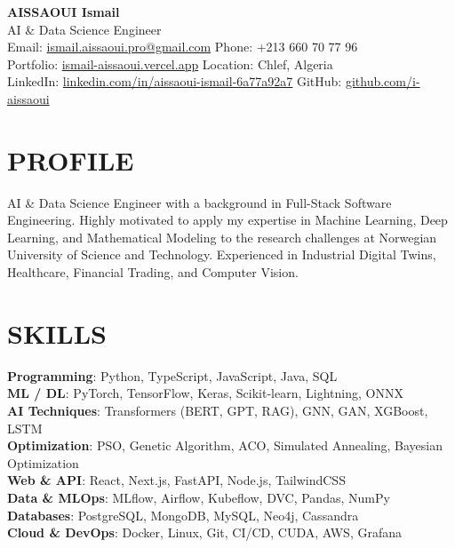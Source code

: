 \documentclass[a4paper,12pt]{article}
\begin{document}
\begin{center}
    {\Huge\bfseries\color{titleblue} AISSAOUI Ismail}\\[4pt]
    {\Large AI \& Data Science Engineer}\\[6pt]

    {\normalsize
    Email: \href{mailto:ismail.aissaoui.pro@gmail.com}{ismail.aissaoui.pro@gmail.com} \quad
    Phone: +213 660 70 77 96 \\
    Portfolio: \href{https://ismail-aissaoui.vercel.app}{ismail-aissaoui.vercel.app} \quad
    Location: Chlef, Algeria \\
    LinkedIn: \href{https://linkedin.com/in/aissaoui-ismail-6a77a92a7}{linkedin.com/in/aissaoui-ismail-6a77a92a7} \quad
    GitHub: \href{https://github.com/i-aissaoui}{github.com/i-aissaoui}
    }
\end{center}

\section{PROFILE}
AI \& Data Science Engineer with a background in Full-Stack Software Engineering. Highly motivated to apply my expertise in Machine Learning, Deep Learning, and Mathematical Modeling to the research challenges at Norwegian University of Science and Technology. Experienced in Industrial Digital Twins, Healthcare, Financial Trading, and Computer Vision.

\section{SKILLS}
\textbf{Programming}: Python, TypeScript, JavaScript, Java, SQL \\
\textbf{ML / DL}: PyTorch, TensorFlow, Keras, Scikit-learn, Lightning, ONNX \\
\textbf{AI Techniques}: Transformers (BERT, GPT, RAG), GNN, GAN, XGBoost, LSTM \\
\textbf{Optimization}: PSO, Genetic Algorithm, ACO, Simulated Annealing, Bayesian Optimization \\
\textbf{Web \& API}: React, Next.js, FastAPI, Node.js, TailwindCSS \\
\textbf{Data \& MLOps}: MLflow, Airflow, Kubeflow, DVC, Pandas, NumPy \\
\textbf{Databases}: PostgreSQL, MongoDB, MySQL, Neo4j, Cassandra \\
\textbf{Cloud \& DevOps}: Docker, Linux, Git, CI/CD, CUDA, AWS, Grafana 
\end{document}
